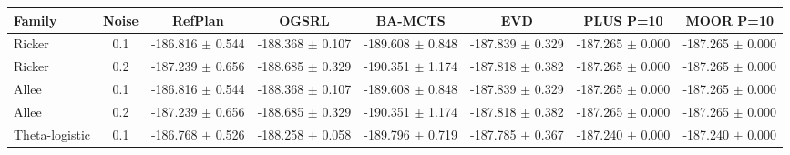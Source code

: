 \documentclass[10pt]{article}
\begin{document}
\begin{table}[p]
\centering
\small
\setlength{\tabcolsep}{3.0pt}
\begin{tabular}{@{}lc*{6}{c}@{}}
\toprule
Family & Noise & RefPlan & OGSRL & BA-MCTS & EVD & PLUS P=10 & MOOR P=10 \\
\midrule
Ricker & 0.1 & \shortstack{-186.816\\$\pm$ 0.544} & \shortstack{-188.368\\$\pm$ 0.107} & \shortstack{-189.608\\$\pm$ 0.848} & \shortstack{-187.839\\$\pm$ 0.329} & \shortstack{-187.265\\$\pm$ 0.000} & \shortstack{-187.265\\$\pm$ 0.000} \\
Ricker & 0.2 & \shortstack{-187.239\\$\pm$ 0.656} & \shortstack{-188.685\\$\pm$ 0.329} & \shortstack{-190.351\\$\pm$ 1.174} & \shortstack{-187.818\\$\pm$ 0.382} & \shortstack{-187.265\\$\pm$ 0.000} & \shortstack{-187.265\\$\pm$ 0.000} \\
\addlinespace[1.5pt]
Allee & 0.1 & \shortstack{-186.816\\$\pm$ 0.544} & \shortstack{-188.368\\$\pm$ 0.107} & \shortstack{-189.608\\$\pm$ 0.848} & \shortstack{-187.839\\$\pm$ 0.329} & \shortstack{-187.265\\$\pm$ 0.000} & \shortstack{-187.265\\$\pm$ 0.000} \\
Allee & 0.2 & \shortstack{-187.239\\$\pm$ 0.656} & \shortstack{-188.685\\$\pm$ 0.329} & \shortstack{-190.351\\$\pm$ 1.174} & \shortstack{-187.818\\$\pm$ 0.382} & \shortstack{-187.265\\$\pm$ 0.000} & \shortstack{-187.265\\$\pm$ 0.000} \\
\addlinespace[1.5pt]
Theta-logistic & 0.1 & \shortstack{-186.768\\$\pm$ 0.526} & \shortstack{-188.258\\$\pm$ 0.058} & \shortstack{-189.796\\$\pm$ 0.719} & \shortstack{-187.785\\$\pm$ 0.367} & \shortstack{-187.240\\$\pm$ 0.000} & \shortstack{-187.240\\$\pm$ 0.000} \\

\end{tabular}
\end{table}
\end{document}
